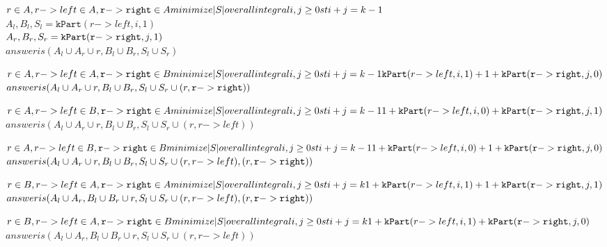 \documentclass[11pt]{article}
\begin{document}
          $r \in A, r->left \in A, \mathtt{r->right } \in A\\
              minimize |S| over all integral i,j \geq 0 st i+j = k-1$\\
                $A_l, B_l, S_l = \mathtt{kPart}(r->left,i,1)$\\
                $A_r, B_r, S_r = \mathtt{kPart}(\mathtt{r->right },j,1)$\\
                $answer is (A_l \cup A_r \cup {r},B_l \cup B_r,S_l \cup S_r)$

          $r \in A, r->left \in A, \mathtt{r->right } \in B\\
              minimize |S| over all integral i,j \geq 0 st i+j = k-1\\
                    \mathtt{kPart}(r->left,i,1) + 1 + \mathtt{kPart}(\mathtt{r->right },j,0)$\\
                $answer is (A_l \cup A_r \cup {r},B_l \cup B_r,S_l \cup S_r \cup {(r, \mathtt{r->right })})$

          $r \in A, r->left \in B, \mathtt{r->right } \in A\\
              minimize |S| over all integral i,j \geq 0 st i+j = k-1\\
                1 + \mathtt{kPart}(r->left,i,0) +     \mathtt{kPart}(\mathtt{r->right },j,1)$\\
                $answer is (A_l \cup A_r \cup {r},B_l \cup B_r,S_l \cup S_r \cup {(r, r->left)})$

          $r \in A, r->left \in B, \mathtt{r->right } \in B\\
              minimize |S| over all integral i,j \geq 0 st i+j = k-1\\
                1 + \mathtt{kPart}(r->left,i,0) + 1 + \mathtt{kPart}(\mathtt{r->right },j,0)$\\
                $answer is (A_l \cup A_r \cup {r},B_l \cup B_r,S_l \cup S_r \cup {(r, r->left),(r, \mathtt{r->right })})$

          $r \in B, r->left \in A, \mathtt{r->right } \in A\\
              minimize |S| over all integral i,j \geq 0 st i+j = k\\
                1 + \mathtt{kPart}(r->left,i,1) + 1 + \mathtt{kPart}(\mathtt{r->right },j,1)$\\
                $answer is (A_l \cup A_r,B_l \cup B_r \cup {r},S_l \cup S_r \cup {(r, r->left),(r, \mathtt{r->right })})$

          $r \in B, r->left \in A, \mathtt{r->right } \in B\\
              minimize |S| over all integral i,j \geq 0 st i+j = k\\
                1 + \mathtt{kPart}(r->left,i,1) +     \mathtt{kPart}(\mathtt{r->right },j,0)$\\
                $answer is (A_l \cup A_r,B_l \cup B_r \cup {r},S_l \cup S_r \cup {(r, r->left)})$
\end{document}
